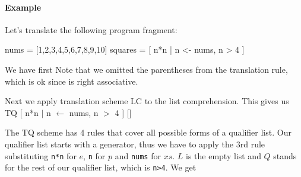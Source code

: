 
\paragraph{Example}
Let's translate the following program fragment:
\begin{code}
nums = [1,2,3,4,5,6,7,8,9,10]
squares = [ n*n | n <- nums, n > 4 ]
\end{code}
We have first 
Note that we omitted the parentheses from the translation rule, which is ok since \sym{:} is right associative.

Next we apply translation scheme LC to the list comprehension. This gives us\\
TQ [ n*n $|$ n $\leftarrow$ nums, n $>$ 4 ] []

The TQ scheme has 4 rules that cover all possible forms of a qualifier list. Our qualifier list starts with a generator, thus we have to apply the 3rd rule substituting \texttt{n*n} for $e$, \texttt{n} for $p$ and \texttt{nums} for $xs$. $L$ is the empty list and $Q$ stands for the rest of our qualifier list, which is \texttt{n>4}.
We get

